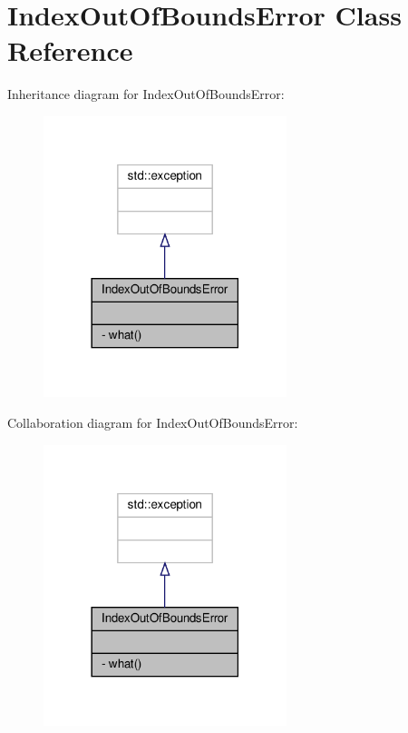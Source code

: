 \hypertarget{classIndexOutOfBoundsError}{}\section{Index\+Out\+Of\+Bounds\+Error Class Reference}
\label{classIndexOutOfBoundsError}


Inheritance diagram for Index\+Out\+Of\+Bounds\+Error\+:\nopagebreak
\begin{figure}[H]
\begin{center}
\leavevmode
\includegraphics[width=201pt]{classIndexOutOfBoundsError__inherit__graph}
\end{center}
\end{figure}


Collaboration diagram for Index\+Out\+Of\+Bounds\+Error\+:\nopagebreak
\begin{figure}[H]
\begin{center}
\leavevmode
\includegraphics[width=201pt]{classIndexOutOfBoundsError__coll__graph}
\end{center}
\end{figure}
